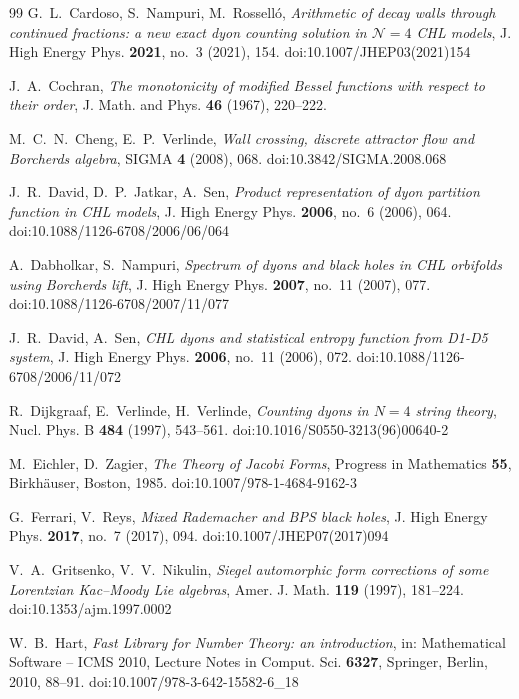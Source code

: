\documentclass[11pt]{amsart}
\theoremstyle{definition}
\begin{document}
\begin{thebibliography}{99}
 G.~L.~Cardoso, S.~Nampuri, M.~Rossell\'o, \emph{Arithmetic of decay walls through continued fractions: a new exact dyon counting solution in $\mathcal N=4$ CHL models}, J. High Energy Phys. \textbf{2021}, no.~3 (2021), 154. doi:10.1007/JHEP03(2021)154

 J.~A.~Cochran, \emph{The monotonicity of modified Bessel functions with respect to their order}, J. Math. and Phys. \textbf{46} (1967), 220--222.

 M.~C.~N.~Cheng, E.~P.~Verlinde, \emph{Wall crossing, discrete attractor flow and Borcherds algebra}, SIGMA \textbf{4} (2008), 068. doi:10.3842/SIGMA.2008.068

 J.~R.~David, D.~P.~Jatkar, A.~Sen, \emph{Product representation of dyon partition function in CHL models}, J. High Energy Phys. \textbf{2006}, no.~6 (2006), 064. doi:10.1088/1126-6708/2006/06/064

 A.~Dabholkar, S.~Nampuri, \emph{Spectrum of dyons and black holes in CHL orbifolds using Borcherds lift}, J. High Energy Phys. \textbf{2007}, no.~11 (2007), 077. doi:10.1088/1126-6708/2007/11/077

 J.~R.~David, A.~Sen, \emph{CHL dyons and statistical entropy function from D1-D5 system}, J. High Energy Phys. \textbf{2006}, no.~11 (2006), 072. doi:10.1088/1126-6708/2006/11/072

 R.~Dijkgraaf, E.~Verlinde, H.~Verlinde, \emph{Counting dyons in $N=4$ string theory}, Nucl. Phys. B \textbf{484} (1997), 543--561. doi:10.1016/S0550-3213(96)00640-2

 M.~Eichler, D.~Zagier, \emph{The Theory of Jacobi Forms}, Progress in Mathematics \textbf{55}, Birkh\"auser, Boston, 1985. doi:10.1007/978-1-4684-9162-3

 G.~Ferrari, V.~Reys, \emph{Mixed Rademacher and BPS black holes}, J. High Energy Phys. \textbf{2017}, no.~7 (2017), 094. doi:10.1007/JHEP07(2017)094

 V.~A.~Gritsenko, V.~V.~Nikulin, \emph{Siegel automorphic form corrections of some Lorentzian Kac--Moody Lie algebras}, Amer. J. Math. \textbf{119} (1997), 181--224. doi:10.1353/ajm.1997.0002

 W.~B.~Hart, \emph{Fast Library for Number Theory: an introduction}, in: Mathematical Software -- ICMS 2010, Lecture Notes in Comput. Sci. \textbf{6327}, Springer, Berlin, 2010, 88--91. doi:10.1007/978-3-642-15582-6\_18


\end{thebibliography}
\end{document}
